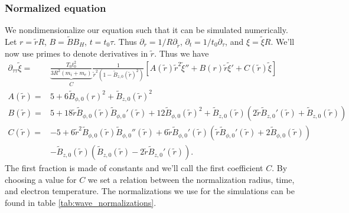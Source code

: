 \subsubsection{Normalized equation}

We nondimensionalize our equation such that it can be simulated numerically. Let $r = \tilde{r}R$, $B = \tilde{B}B_H$, $t=t_0 \tau$. Thus $\partial_r = 1/R \partial_{\tilde{r}}$, $\partial_t = 1/t_0 \partial_\tau$, and $\xi = \tilde{\xi}R$. We'll now use primes to denote derivatives in $\tilde{r}$. Thus we have
\begin{align}
  \partial_{\tau\tau}\tilde{\xi} =& \underbrace{\frac{T_0 t_0^2}{3 R^2 (m_i + m_e)}}_{C} \frac{1}{\tilde{r}^2\left(1 - \tilde{B}_{z, 0}(\tilde{r})^2\right)} \left[ A(\tilde{r}) \tilde{r}^2 \tilde{\xi}'' + B(r) \tilde{r}\tilde{\xi}' + C(\tilde{r}) \tilde{\xi} \right]
  \label{eq:dedimensionalized_pde} \\
  A(\tilde{r}) =& 5 + 6 \tilde{B}_{\phi, 0}(r)^2 + \tilde{B}_{z, 0}(\tilde{r})^2 \nonumber \\
  B(\tilde{r}) =& 5 + 18 \tilde{r} \tilde{B}_{\phi, 0}(\tilde{r}) \tilde{B}_{\phi, 0}'(\tilde{r}) + 12 \tilde{B}_{\phi, 0}(\tilde{r})^2 + \tilde{B}_{z, 0}(\tilde{r}) \left(2 \tilde{r} \tilde{B}_{z, 0}'(\tilde{r}) + \tilde{B}_{z, 0}(\tilde{r})\right) \nonumber \\
  C(\tilde{r}) =& -5 + 6 \tilde{r}^2 \tilde{B}_{\phi, 0}(\tilde{r}) \tilde{B}_{\phi, 0}''(\tilde{r}) + 6 \tilde{r} \tilde{B}_{\phi, 0}'(\tilde{r}) \left(\tilde{r} \tilde{B}_{\phi, 0}'(\tilde{r}) + 2 \tilde{B}_{\phi, 0}(\tilde{r})\right) \nonumber \\
  &- \tilde{B}_{z, 0}(\tilde{r}) \left(\tilde{B}_{z, 0}(\tilde{r}) - 2 \tilde{r} \tilde{B}_{z, 0}'(\tilde{r})\right) \nonumber.
\end{align}
The first fraction is made of constants and we'll call the first coefficient $C$. By choosing a value for $C$ we set a relation between the normalization radius, time, and electron temperature. The normalizations we use for the simulations can be found in table \ref{tab:wave_normalizations}.

